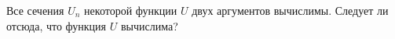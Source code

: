 Все сечения $U_n$ некоторой функции $U$ двух аргументов вычислимы. Следует ли отсюда, что функция $U$
вычислима?